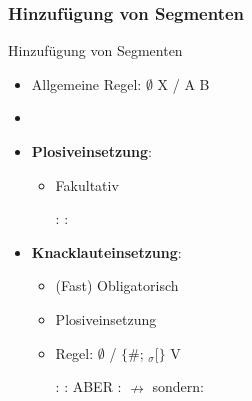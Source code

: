 %
\subsubsection{Hinzufügung von Segmenten}
%

\begin{frame}{Hinzufügung von Segmenten}

\begin{itemize}
	\item Allgemeine Regel: $\emptyset$ \ras X / A \underline{\quad} B
	\item[]
	\item \textbf{Plosiveinsetzung}:
	
	\begin{itemize}
		\item Fakultativ
		
	\eal
		\ex {}:  \ras \textipa{[Pampt]}
		\ex {}:  \ras \textipa{[gants]}
	\zl
	
	\end{itemize}

	\item \textbf{Knacklauteinsetzung}:

	\begin{itemize}
		\item (Fast) Obligatorisch
		\item Plosiveinsetzung
		\item Regel: $\emptyset$ \ras \textipa{[P]} / 
		$\{$\#; \textprimstress$_\sigma[\}$ 
\underline{\quad} V

	\eal
		\ex {}:  \ras {}
		\ex {}:  \ras \textipa{[Pa\t{pf}@l]}
		\ex ABER :  $\nrightarrow$ \textipa{[\textprimstress ge:.P@n]} sondern: \textipa{[\textprimstress ge:.@n]}
	\zl
	
	\end{itemize}
			
\end{itemize}

\end{frame}




